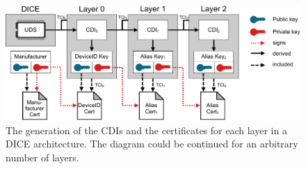 \begin{figure}[htpb]
  \centering
  \includegraphics[width=1\linewidth]{figures/dice-layers.pdf}
  \caption{The generation of the \acp{CDI} and the certificates for each layer in a \ac{DICE} architecture. The diagram could be continued for an arbitrary number of layers.}\label{fig:dice-layers}
\end{figure}
